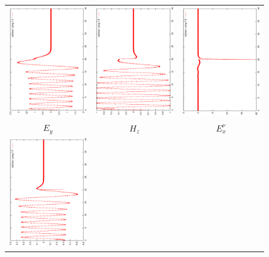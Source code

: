 \begin{figure}[h]
	\begin{center}
		\begin{tabular}{ccc}
			\includegraphics[angle=-90,width=5.cm]{pics_semilagrange/Ey_moit.eps}
			&
			\includegraphics[angle=-90,width=5.cm]{pics_semilagrange/Hz_moit.eps} &
			\includegraphics[angle=-90,width=5.cm]{pics_semilagrange/Ex_moit.eps}
			\\
			$E_y$ & $H_z$  & $E_x^\nu$ \\
			\includegraphics[angle=-90,width=5.cm]{pics_semilagrange/uy_moit.eps}

\end{tabular}
\end{center}
\end{figure}
